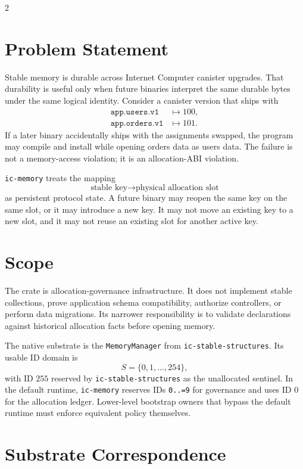 \documentclass[11pt]{article}
\begin{document}
\begin{multicols}{2}
\raggedright

\section{Problem Statement}

Stable memory is durable across Internet Computer canister upgrades. That
durability is useful only when future binaries interpret the same durable bytes
under the same logical identity. Consider a canister version that ships with
\[
  \begin{aligned}
  \texttt{app.users.v1} &\mapsto 100,\\
  \texttt{app.orders.v1} &\mapsto 101.
  \end{aligned}
\]
If a later binary accidentally ships with the assignments swapped, the program
may compile and install while opening orders data as users data. The failure is
not a memory-access violation; it is an allocation-ABI violation.

\texttt{ic-memory} treats the mapping
\[
  \text{stable key} \longrightarrow \text{physical allocation slot}
\]
as persistent protocol state. A future binary may reopen the same key on the
same slot, or it may introduce a new key. It may not move an existing key to a
new slot, and it may not reuse an existing slot for another active key.

\section{Scope}

The crate is allocation-governance infrastructure. It does not implement stable
collections, prove application schema compatibility, authorize controllers, or
perform data migrations. Its narrower responsibility is to validate declarations
against historical allocation facts before opening memory.

The native substrate is the \texttt{MemoryManager} from
\texttt{ic-stable-structures}. Its usable ID domain is
\[
  S = \{0,1,\ldots,254\},
\]
with ID \(255\) reserved by \texttt{ic-stable-structures} as the unallocated
sentinel. In the default runtime, \texttt{ic-memory} reserves IDs
\texttt{0..=9} for governance and uses ID \(0\) for the allocation ledger.
Lower-level bootstrap
owners that bypass the default runtime must enforce equivalent policy
themselves.

\section{Substrate Correspondence}


\end{multicols}
\end{document}
